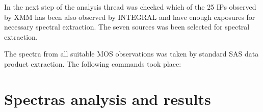 \documentclass[oneside,a4paper,11pt]{report}
\begin{document}
In the next step of the analysis thread was checked which of the 25 IPs observed by XMM has been also 
observed by INTEGRAL and have enough exposures for necessary spectral extraction. The seven sources 
was been selected for spectral extraction.   

The spectra from all suitable MOS observations was taken by standard SAS data product extraction. The 
following commands took place:

\section{Spectras analysis and results}
\end{document}
